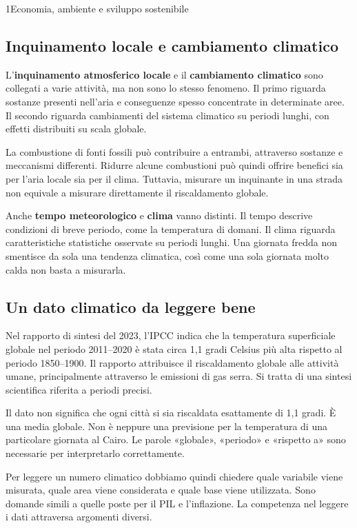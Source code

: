 \begin{lettura}{1}{Economia, ambiente e sviluppo sostenibile}
\subsection*{Inquinamento locale e cambiamento climatico}
L'\textbf{inquinamento atmosferico locale} e il \textbf{cambiamento climatico} sono collegati a varie attività, ma non sono lo stesso fenomeno. Il primo riguarda sostanze presenti nell'aria e conseguenze spesso concentrate in determinate aree. Il secondo riguarda cambiamenti del sistema climatico su periodi lunghi, con effetti distribuiti su scala globale.

La combustione di fonti fossili può contribuire a entrambi, attraverso sostanze e meccanismi differenti. Ridurre alcune combustioni può quindi offrire benefici sia per l'aria locale sia per il clima. Tuttavia, misurare un inquinante in una strada non equivale a misurare direttamente il riscaldamento globale.

Anche \textbf{tempo meteorologico} e \textbf{clima} vanno distinti. Il tempo descrive condizioni di breve periodo, come la temperatura di domani. Il clima riguarda caratteristiche statistiche osservate su periodi lunghi. Una giornata fredda non smentisce da sola una tendenza climatica, così come una sola giornata molto calda non basta a misurarla.

\subsection*{Un dato climatico da leggere bene}
Nel rapporto di sintesi del 2023, l'IPCC indica che la temperatura superficiale globale nel periodo 2011--2020 è stata circa 1,1 gradi Celsius più alta rispetto al periodo 1850--1900. Il rapporto attribuisce il riscaldamento globale alle attività umane, principalmente attraverso le emissioni di gas serra. Si tratta di una sintesi scientifica riferita a periodi precisi.

Il dato non significa che ogni città si sia riscaldata esattamente di 1,1 gradi. È una media globale. Non è neppure una previsione per la temperatura di una particolare giornata al Cairo. Le parole «globale», «periodo» e «rispetto a» sono necessarie per interpretarlo correttamente.

Per leggere un numero climatico dobbiamo quindi chiedere quale variabile viene misurata, quale area viene considerata e quale base viene utilizzata. Sono domande simili a quelle poste per il PIL e l'inflazione. La competenza nel leggere i dati attraversa argomenti diversi.


\end{lettura}
